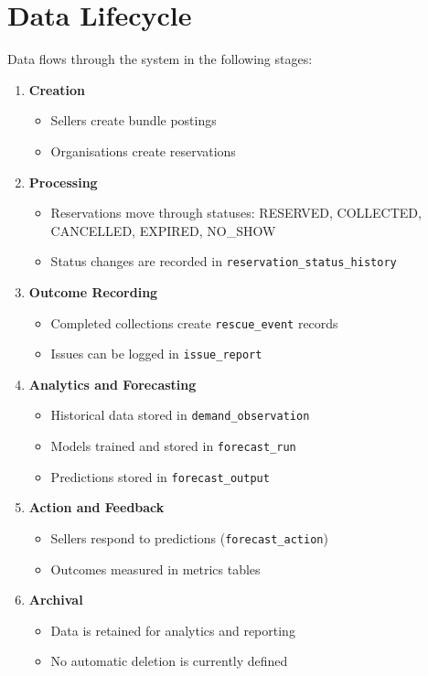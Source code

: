 \documentclass[12pt]{article}
\begin{document}
\section{Data Lifecycle}
Data flows through the system in the following stages:
\begin{enumerate}
\item \textbf{Creation}
\begin{itemize}
\item Sellers create bundle postings
\item Organisations create reservations
\end{itemize}
\item \textbf{Processing}
\begin{itemize}
\item Reservations move through statuses: RESERVED, COLLECTED, CANCELLED, EXPIRED, NO\_SHOW
\item Status changes are recorded in \texttt{reservation\_status\_history}
\end{itemize}
\item \textbf{Outcome Recording}
\begin{itemize}
\item Completed collections create \texttt{rescue\_event} records
\item Issues can be logged in \texttt{issue\_report}
\end{itemize}
\item \textbf{Analytics and Forecasting}
\begin{itemize}
\item Historical data stored in \texttt{demand\_observation}
\item Models trained and stored in \texttt{forecast\_run}
\item Predictions stored in \texttt{forecast\_output}
\end{itemize}
\item \textbf{Action and Feedback}
\begin{itemize}
\item Sellers respond to predictions (\texttt{forecast\_action})
\item Outcomes measured in metrics tables
\end{itemize}
\item \textbf{Archival}
\begin{itemize}
\item Data is retained for analytics and reporting
\item No automatic deletion is currently defined
\end{itemize}
\end{enumerate}
\end{document}
